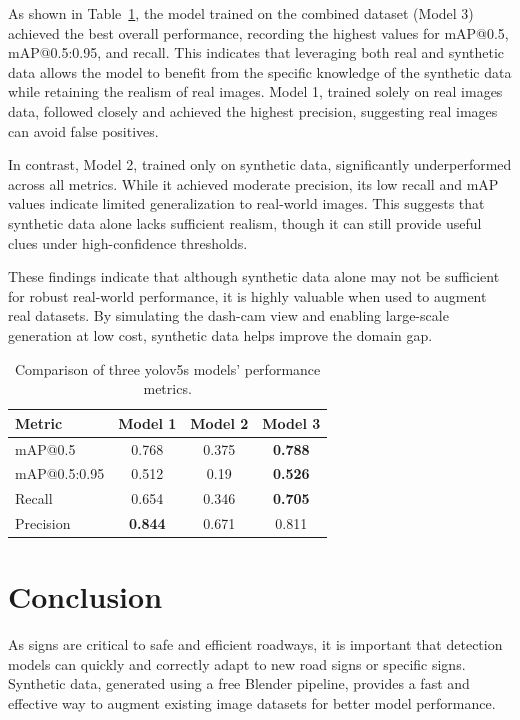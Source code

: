 \documentclass[journal]{IEEEtran}
\begin{document}
As shown in Table~\ref{tab:model_comparison}, the model trained on the combined dataset (Model 3) achieved the best overall performance, recording the highest values for mAP@0.5, mAP@0.5:0.95, and recall. This indicates that leveraging both real and synthetic data allows the model to benefit from the specific knowledge of the synthetic data while retaining the realism of real images. Model 1, trained solely on real images data, followed closely and achieved the highest precision, suggesting real images can avoid false positives.

In contrast, Model 2, trained only on synthetic data, significantly underperformed across all metrics. While it achieved moderate precision, its low recall and mAP values indicate limited generalization to real-world images. This suggests that synthetic data alone lacks sufficient realism, though it can still provide useful clues under high-confidence thresholds.

These findings indicate that although synthetic data alone may not be sufficient for robust real-world performance, it is highly valuable when used to augment real datasets. By simulating the dash-cam view and enabling large-scale generation at low cost, synthetic data helps improve the domain gap.



\begin{table}[ht]
\centering
\begin{tabular}{|l|c|c|c|}
\hline
\textbf{Metric} & \textbf{Model 1} & \textbf{Model 2} & \textbf{Model 3} \\
\hline
mAP@0.5 & 0.768 & 0.375 &  \textbf{0.788}\\
mAP@0.5:0.95 & 0.512 & 0.19 & \textbf{0.526}\\
Recall & 0.654 & 0.346 & \textbf{0.705}\\
Precision & \textbf{0.844} & 0.671& 0.811 \\
\hline
\end{tabular}
\caption{Comparison of three yolov5s models' performance metrics.}
\label{tab:model_comparison}
\end{table}

\section{Conclusion}
As signs are critical to safe and efficient roadways, it is important that detection models can quickly and correctly adapt to new road signs or specific signs. Synthetic data, generated using a free Blender pipeline, provides a fast and effective way to augment existing image datasets for better model performance.
\end{document}
